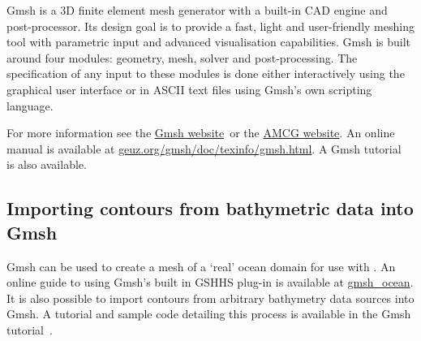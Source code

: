 Gmsh is a 3D finite element mesh generator with a built-in CAD engine and post-processor.
Its design goal is to provide a fast, light and user-friendly meshing tool with parametric
input and advanced visualisation capabilities. Gmsh is built around four modules: geometry, 
mesh, solver and post-processing. The specification of any input to these modules is done
either interactively using the graphical user interface or in ASCII text files using Gmsh's
own scripting language. 

For more information see the \href{http://geuz.org/gmsh/}{Gmsh website}\ or the \href{http://amcg.ese.ic.ac.uk}{AMCG
website}. An online manual is available at \href{http://geuz.org/gmsh/doc/texinfo/gmsh.html}{geuz.org/gmsh/doc/texinfo/gmsh.html}.
A Gmsh tutorial~\cite{amcggmshtutorial} is also available.

\subsection{Importing contours from bathymetric data into Gmsh}

Gmsh can be used to create a mesh of a `real' ocean domain for use with \fluidity. An online guide to using Gmsh's built in
GSHHS plug-in is available at \href{http://perso.uclouvain.be/jonathan.lambrechts/gmsh_ocean/}{gmsh\_ocean}.
It is also possible to import contours from arbitrary bathymetry data sources into Gmsh. A tutorial and sample code detailing this process 
is available in the Gmsh tutorial~\cite{amcggmshtutorial}.
